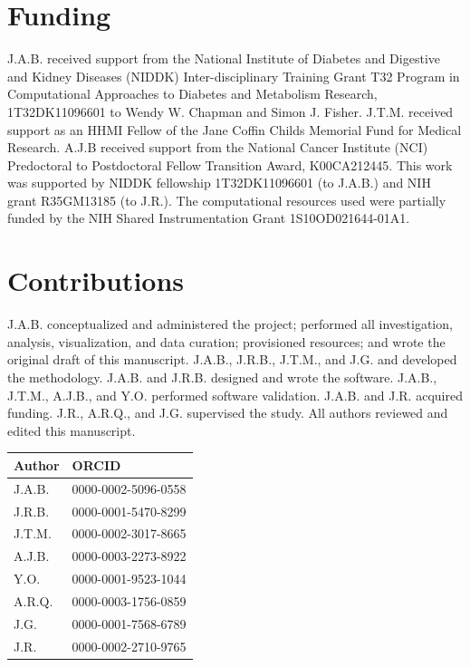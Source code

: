 \documentclass[10pt, oneside]{article}
\begin{document}
\section*{Funding}
J.A.B. received support from the National Institute of Diabetes and Digestive and Kidney Diseases (NIDDK) Inter-disciplinary Training Grant T32 Program in Computational Approaches to Diabetes and Metabolism Research, 1T32DK11096601 to Wendy W. Chapman and Simon J. Fisher. J.T.M. received support as an HHMI Fellow of the Jane Coffin Childs Memorial Fund for Medical Research. A.J.B received support from the National Cancer Institute (NCI) Predoctoral to Postdoctoral Fellow Transition Award, K00CA212445. This work was supported by NIDDK fellowship 1T32DK11096601 (to J.A.B.) and NIH grant R35GM13185 (to J.R.). The computational resources used were partially funded by the NIH Shared Instrumentation Grant 1S10OD021644-01A1.\\

\section*{Contributions}
J.A.B. conceptualized and administered the project; performed all investigation, analysis, visualization, and data curation; provisioned resources; and wrote the original draft of this manuscript. J.A.B., J.R.B., J.T.M., and J.G. and developed the methodology. J.A.B. and J.R.B. designed and wrote the software. J.A.B., J.T.M., A.J.B., and Y.O. performed software validation. J.A.B. and J.R. acquired funding. J.R., A.R.Q., and J.G. supervised the study. All authors reviewed and edited this manuscript.\\

\begin{table}[!]
    \centering
{}
\begin{tabular}{p{1.5cm}p{4cm}}
 \textbf{Author} & \textbf{ORCID}\\
 \hline
 J.A.B. & 0000-0002-5096-0558 \\
 \hline
 J.R.B. & 0000-0001-5470-8299 \\
 \hline
 J.T.M. & 0000-0002-3017-8665 \\
 \hline
 A.J.B. & 0000-0003-2273-8922 \\
 \hline
 Y.O. & 0000-0001-9523-1044 \\
 \hline
 A.R.Q. & 0000-0003-1756-0859 \\
 \hline
 J.G. & 0000-0001-7568-6789 \\
 \hline
 J.R. & 0000-0002-2710-9765 \\
\end{tabular}
\end{table}
\end{document}
